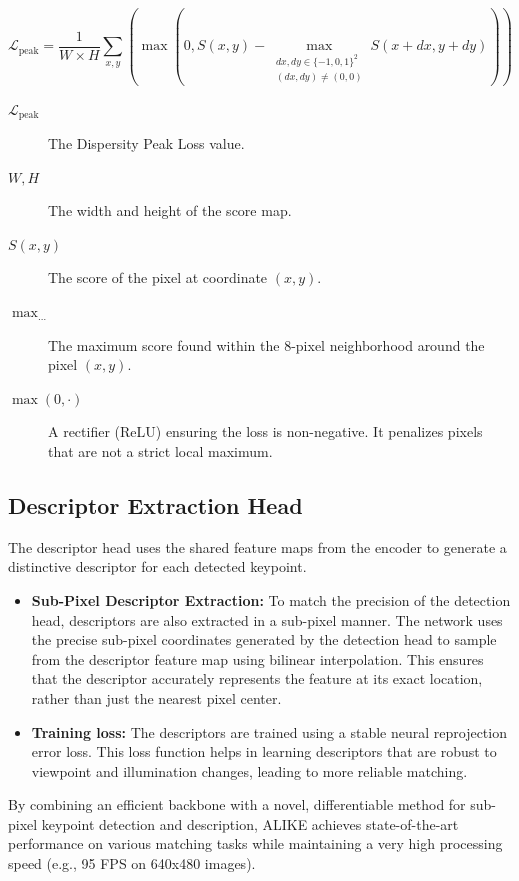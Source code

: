 \begin{itemize}
\begin{itemize}
                    \begin{equation*}
                        \mathcal{L}_{\text{peak}} = \frac{1}{W \times H} \sum_{x,y} \left( \max(0, S(x,y) - \max_{\substack{dx,dy \in \{-1,0,1\}^2 \\ (dx,dy) \neq (0,0)}} S(x+dx, y+dy)) \right)
                    \end{equation*}
                    {\footnotesize
                    \begin{description}
                        \item[$\mathcal{L}_{\text{peak}}$] The Dispersity Peak Loss value.
                        \item[$W, H$] The width and height of the score map.
                        \item[$S(x,y)$] The score of the pixel at coordinate $(x,y)$.
                        \item[$\max_{\dots}$] The maximum score found within the 8-pixel neighborhood around the pixel $(x,y)$.
                        \item[$\max(0, \cdot)$] A rectifier (ReLU) ensuring the loss is non-negative. It penalizes pixels that are not a strict local maximum.
                    \end{description}}
          \end{itemize}
\end{itemize}
\subsection{Descriptor Extraction Head}
The descriptor head uses the shared feature maps from the encoder to generate a
distinctive descriptor for each detected keypoint.
\begin{itemize}
    \item \textbf{Sub-Pixel Descriptor Extraction:} To match the precision of the detection head, descriptors are also extracted in a sub-pixel manner. The network uses the precise sub-pixel coordinates generated by the detection head to sample from the descriptor feature map using bilinear interpolation. This ensures that the descriptor accurately represents the feature at its exact location, rather than just the nearest pixel center.
    \item \textbf{Training loss:} The descriptors are trained using a stable neural reprojection error loss. This loss function helps in learning descriptors that are robust to viewpoint and illumination changes, leading to more reliable matching.
\end{itemize}
By combining an efficient backbone with a novel, differentiable method for sub-pixel keypoint detection and description, ALIKE achieves state-of-the-art performance on various matching tasks while maintaining a very high processing speed (e.g., 95 FPS on 640x480 images).
